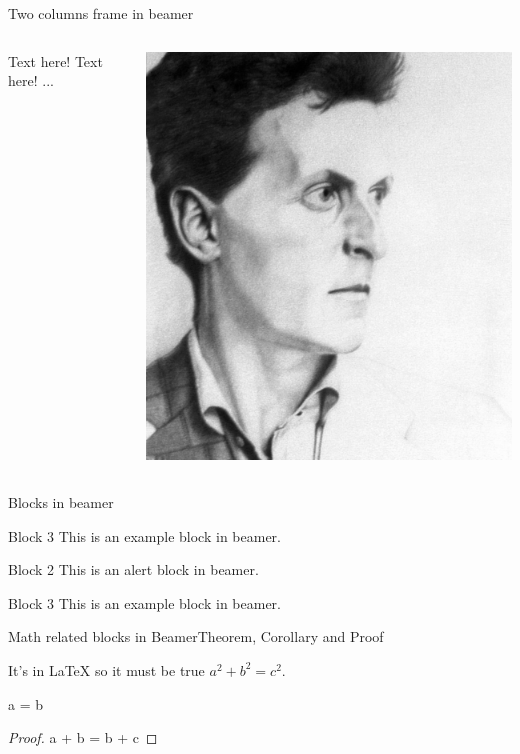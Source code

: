 \documentclass{beamer}
\begin{document}
\begin{frame}{Two columns frame in beamer}

\begin{columns}
\begin{column}{0.5\textwidth}
    Text here! Text here! ...
\end{column}

\begin{column}{0.5\textwidth}
    \includegraphics[scale=0.5]{wittgenstein.png}
\end{column}
\end{columns}
\end{frame}
\begin{frame}{Blocks in beamer}{}

\begin{exampleblock}{Block 3}
This is an example block in beamer.
\end{exampleblock}

\begin{alertblock}{Block 2}
This is an alert block in beamer.
\end{alertblock}

\begin{exampleblock}{Block 3}
This is an example block in beamer.
\end{exampleblock}
\end{frame}

\begin{frame}{Math related blocks in Beamer}{Theorem, Corollary and Proof}
\begin{theorem}
    It's in \LaTeX{} so it must be true $ a^2 + b^2 = c^2$.
\end{theorem}

\begin{corollary}
    a = b
\end{corollary}

\begin{proof}
    a + b = b + c
\end{proof}
\end{frame}
\end{document}
